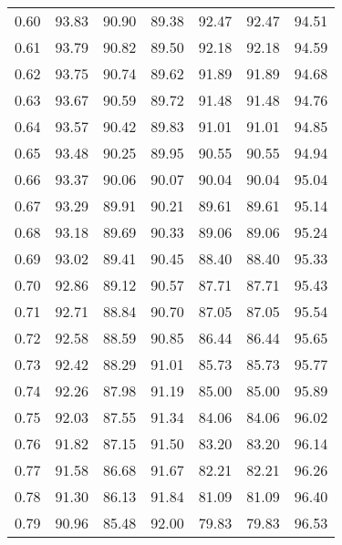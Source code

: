 \begin{tabular}{|c|c|c|c|c|c|c|}
      0.60 &     93.83 &     90.90 &      89.38 &   92.47 &      92.47 &         94.51 \\
      0.61 &     93.79 &     90.82 &      89.50 &   92.18 &      92.18 &         94.59 \\
      0.62 &     93.75 &     90.74 &      89.62 &   91.89 &      91.89 &         94.68 \\
      0.63 &     93.67 &     90.59 &      89.72 &   91.48 &      91.48 &         94.76 \\
      0.64 &     93.57 &     90.42 &      89.83 &   91.01 &      91.01 &         94.85 \\
      0.65 &     93.48 &     90.25 &      89.95 &   90.55 &      90.55 &         94.94 \\
      0.66 &     93.37 &     90.06 &      90.07 &   90.04 &      90.04 &         95.04 \\
      0.67 &     93.29 &     89.91 &      90.21 &   89.61 &      89.61 &         95.14 \\
      0.68 &     93.18 &     89.69 &      90.33 &   89.06 &      89.06 &         95.24 \\
      0.69 &     93.02 &     89.41 &      90.45 &   88.40 &      88.40 &         95.33 \\
      0.70 &     92.86 &     89.12 &      90.57 &   87.71 &      87.71 &         95.43 \\
      0.71 &     92.71 &     88.84 &      90.70 &   87.05 &      87.05 &         95.54 \\
      0.72 &     92.58 &     88.59 &      90.85 &   86.44 &      86.44 &         95.65 \\
      0.73 &     92.42 &     88.29 &      91.01 &   85.73 &      85.73 &         95.77 \\
      0.74 &     92.26 &     87.98 &      91.19 &   85.00 &      85.00 &         95.89 \\
      0.75 &     92.03 &     87.55 &      91.34 &   84.06 &      84.06 &         96.02 \\
      0.76 &     91.82 &     87.15 &      91.50 &   83.20 &      83.20 &         96.14 \\
      0.77 &     91.58 &     86.68 &      91.67 &   82.21 &      82.21 &         96.26 \\
      0.78 &     91.30 &     86.13 &      91.84 &   81.09 &      81.09 &         96.40 \\
      0.79 &     90.96 &     85.48 &      92.00 &   79.83 &      79.83 &         96.53 \\

\end{tabular}
